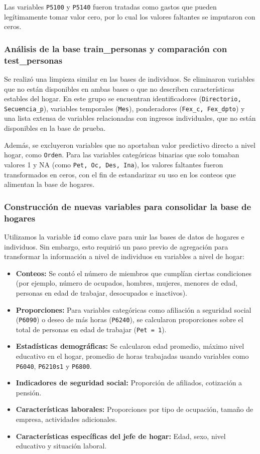 \documentclass[12pt,a4paper,onecolumn]{article}
\begin{document}
Las variables \texttt{P5100} y \texttt{P5140} fueron tratadas como gastos que pueden legítimamente tomar valor cero, por lo cual los valores faltantes se imputaron con ceros.

\subsubsection{Análisis de la base train\_personas y comparación con test\_personas}

Se realizó una limpieza similar en las bases de individuos. Se eliminaron variables que no están disponibles en ambas bases o que no describen características estables del hogar. En este grupo se encuentran identificadores (\texttt{Directorio, Secuencia\_p}), variables temporales (\texttt{Mes}), ponderadores (\texttt{Fex\_c, Fex\_dpto}) y una lista extensa de variables relacionadas con ingresos individuales, que no están disponibles en la base de prueba.

Además, se excluyeron variables que no aportaban valor predictivo directo a nivel hogar, como \texttt{Orden}. Para las variables categóricas binarias que solo tomaban valores 1 y NA (como \texttt{Pet, Oc, Des, Ina}), los valores faltantes fueron transformados en ceros, con el fin de estandarizar su uso en los conteos que alimentan la base de hogares.

\subsubsection{Construcción de nuevas variables para consolidar la base de hogares}

Utilizamos la variable \texttt{id} como clave para unir las bases de datos de hogares e individuos. Sin embargo, esto requirió un paso previo de agregación para transformar la información a nivel de individuos en variables a nivel de hogar:

\begin{itemize}
    \item \textbf{Conteos:} Se contó el número de miembros que cumplían ciertas condiciones (por ejemplo, número de ocupados, hombres, mujeres, menores de edad, personas en edad de trabajar, desocupados e inactivos).
    \item \textbf{Proporciones:} Para variables categóricas como afiliación a seguridad social (\texttt{P6090}) o deseo de más horas (\texttt{P6240}), se calcularon proporciones sobre el total de personas en edad de trabajar (\texttt{Pet = 1}).
    \item \textbf{Estadísticas demográficas:} Se calcularon edad promedio, máximo nivel educativo en el hogar, promedio de horas trabajadas usando variables como \texttt{P6040}, \texttt{P6210s1} y \texttt{P6800}.
    \item \textbf{Indicadores de seguridad social:} Proporción de afiliados, cotización a pensión.
    \item \textbf{Características laborales:} Proporciones por tipo de ocupación, tamaño de empresa, actividades adicionales.
    \item \textbf{Características específicas del jefe de hogar:} Edad, sexo, nivel educativo y situación laboral.
\end{itemize}
\end{document}

